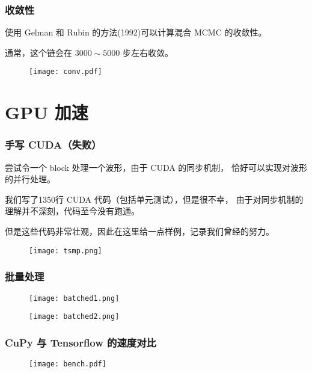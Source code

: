 \documentclass[aspectratio=169]{beamer}
\begin{document}
\begin{frame}
    \frametitle{收敛性}

    使用 Gelman 和 Rubin 的方法(1992)可以计算混合 MCMC 的收敛性。

    通常，这个链会在 $3000\sim 5000$ 步左右收敛。

    \begin{figure}
        \centering
        \texttt{[image: conv.pdf]}
    \end{figure}

\end{frame}
\section{GPU 加速}
\begin{frame}
    \frametitle{手写 CUDA（失败）}

    \begin{multicols}{2}
        尝试令一个 block 处理一个波形，由于 CUDA 的同步机制，
        恰好可以实现对波形的并行处理。

        我们写了1350行 CUDA 代码（包括单元测试），但是很不幸，
        由于对同步机制的理解并不深刻，代码至今没有跑通。

        但是这些代码非常壮观，因此在这里给一点样例，记录我们曾经的努力。
        \columnbreak
        \begin{figure}
            \texttt{[image: tsmp.png]}
        \end{figure}
    \end{multicols}

\end{frame}

\begin{frame}[allowframebreaks]
    \frametitle{批量处理}

    \begin{figure}
        \centering
        \texttt{[image: batched1.png]}
    \end{figure}

    \begin{figure}
        \centering
        \texttt{[image: batched2.png]}
    \end{figure}

\end{frame}

\begin{frame}
    \frametitle{CuPy 与 Tensorflow 的速度对比}

    \begin{figure}
        \centering
        \texttt{[image: bench.pdf]}
    \end{figure}

\end{frame}
\end{document}
